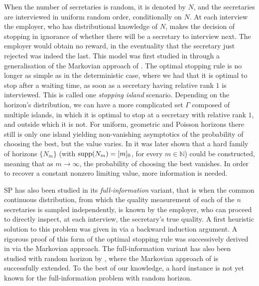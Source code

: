 \documentclass[11pt, a4paper, twoside]{article}
\newcommand{\NN}{\mathbb{N}}
\numberwithin{equation}{section}
\begin{document}
	When the number of secretaries is random, it is denoted by $N$, and the secretaries are interviewed in uniform random order, conditionally on $N$. At each interview the employer, who has distributional knowledge of $N$, makes the decision of stopping in ignorance of whether there will be a secretary to interview next. The employer would obtain no reward, in the eventuality that the secretary just rejected was indeed the last. This model was first studied in \cite{PresSon72} through a generalisation of the Markovian approach of \cite{Dynk63}. The optimal stopping rule is no longer as simple as in the deterministic case, where we had that it is optimal to stop after a waiting time, as soon as a secretary having relative rank $1$ is interviewed. This is called one \textit{stopping island} scenario. Depending on the horizon's distribution, we can have a more complicated set $\Gamma$ composed of multiple islands, in which it is optimal to stop at a secretary with relative rank $1$, and outside which it is not. For uniform, geometric and Poisson horizons there still is only one island yielding non-vanishing asymptotics of the probability of choosing the best, but the value varies. In \cite{AbdBatTrus82} it was later shown that a hard family of horizons $\{N_m\}$ (with $\operatorname{supp}(N_m)=[m]_0$, for every $m\in\NN$) could be constructed, meaning that as $m\longrightarrow\infty$, the probability of choosing the best vanishes. In order to recover a constant nonzero limiting value, more information is needed.

	SP has also been studied in its \textit{full-information} variant, that is when the common continuous distribution, from which the quality measurement of each of the $n$ secretaries is sampled independently, is known by the employer, who can proceed to directly inspect, at each interview, the secretary's true quality. A first heuristic solution to this problem was given in \cite{GilMost66} via a backward induction argument. A rigorous proof of this form of the optimal stopping rule was successively derived in \cite{Boj78} via the Markovian approach. The full-information variant has also been studied with random horizon by \cite{Por87}, where the Markovian approach of \cite{Boj78} is successfully extended. To the best of our knowledge, a hard instance is not yet known for the full-information problem with random horizon. 
\end{document}
